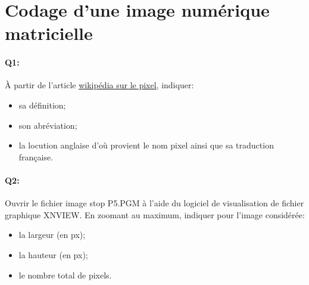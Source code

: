 \documentclass{article}
\begin{document}
\section{Codage d'une image numérique matricielle}
\paragraph{Q1:}
À partir de l'article \href{https://fr.wikipedia.org/wiki/Pixel}{wikipédia sur le pixel}, indiquer:
\begin{itemize}
	\item sa définition;
	\item son abréviation;
	\item la locution anglaise d’où provient le nom \og{}pixel\fg{} ainsi que sa traduction française.
\end{itemize}

\vspace{1em}
\begin{Form}
	\TextField[name=r1,width=\linewidth,height=5em,multiline=true]{}
\end{Form}

\paragraph{Q2:}
Ouvrir le fichier image \og{}stop P5.PGM\fg{} à l'aide du logiciel de visualisation de fichier graphique XNVIEW. 
En zoomant au maximum, indiquer pour l'image considérée:
\begin{itemize}
	\item la largeur (en px);
	\item la hauteur (en px);
	\item le nombre total de pixels.
\end{itemize}

\vspace{1em}
\begin{Form}
	\TextField[name=r2,width=\linewidth,height=5em,multiline=true]{}
\end{Form}

\newpage
\end{document}
